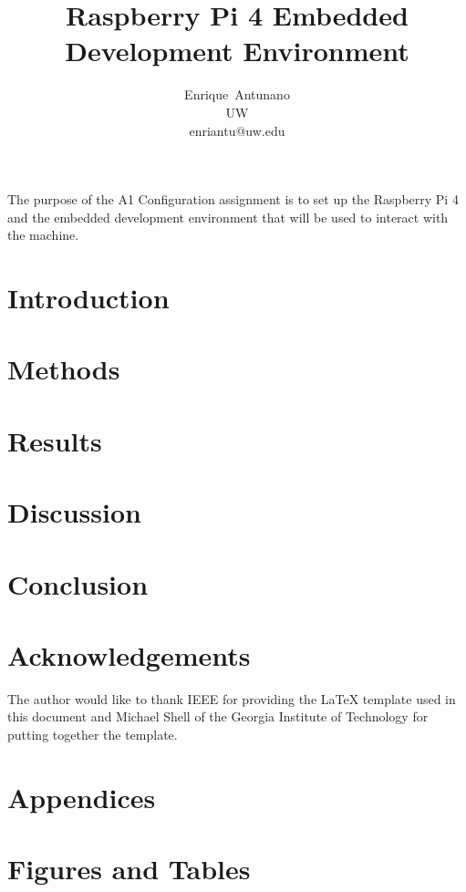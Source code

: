 \documentclass[journal]{IEEEtran}
\begin{document}
\title{Raspberry Pi 4 Embedded Development Environment}

\author{Enrique~Antunano\\UW\\enriantu@uw.edu}


\maketitle

\begin{abstract}

\end{abstract}
The purpose of the A1 Configuration assignment is to set up the Raspberry Pi 4 and the embedded development environment that will be used to interact with the machine. 
\section{Introduction}

\section{Methods}

\section{Results}

\section{Discussion}

\section{Conclusion}

\nocite{*}
\newpage




\newpage
\section{Acknowledgements}
The author would like to thank IEEE for providing the LaTeX template used in this document and Michael Shell of the Georgia Institute of Technology for putting together the template.

\section{Appendices}

\section{Figures and Tables}
\end{document}
